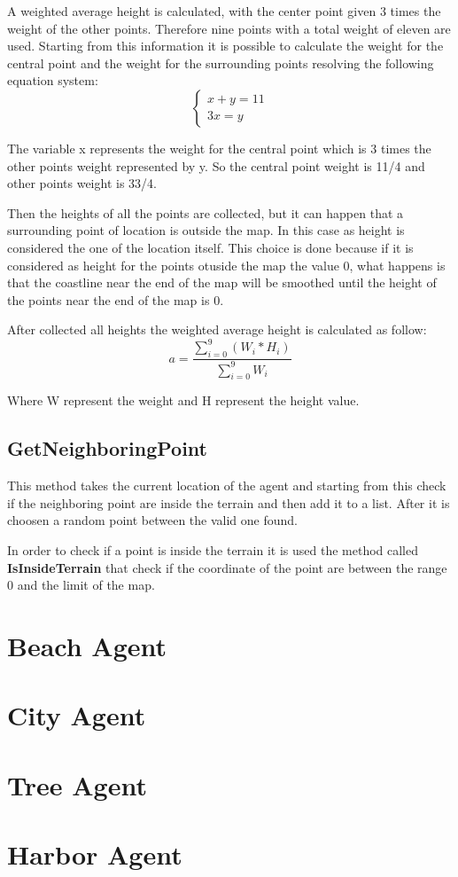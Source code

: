 \documentclass[12pt]{article}
\begin{document}
    \noindent
    A weighted average height is calculated, with the center point given 3 times the weight of the other points. Therefore nine points with a total weight of eleven are used.
    Starting from this information it is possible to calculate the weight for the central point and the weight for the surrounding points resolving the following equation system:
    \begin{equation}
        \begin{cases}
            x + y = 11
            \\ 3x = y
        \end{cases}
    \end{equation}

    \noindent
    The variable x represents the weight for the central point which is 3 times the other points weight represented by y. So the central point weight is 11/4 and other points weight is 33/4.

    Then the heights of all the points are collected, but it can happen that a surrounding point of location is outside the map. In this case as height is considered the one of the location
    itself. This choice is done because if it is considered as height for the points otuside the map the value 0, what happens is that the coastline near the end of the map will be smoothed 
    until the height of the points near the end of the map is 0.
    
    After collected all heights the weighted average height is calculated as follow:
    \begin{equation}
        a = \dfrac{\sum\limits_{i=0}^{9} (W_i * H_i) }{\sum\limits_{i=0}^{9} W_i }
    \end{equation}

    \noindent
    Where W represent the weight and H represent the height value. 

    \subsection{GetNeighboringPoint}
    This method takes the current location of the agent and starting from this check if the neighboring point are inside the terrain and then add it to a list. After it is choosen a 
    random point between the valid one found.

    In order to check if a point is inside the terrain it is used the method called \textbf{IsInsideTerrain} that check if the coordinate of the point are between the range 0 and
    the limit of the map.

    \section{Beach Agent}

    \section{City Agent}

    \section{Tree Agent}

    \section{Harbor Agent}
\end{document}
